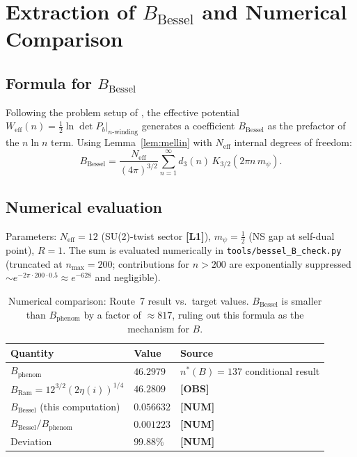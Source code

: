 \documentclass[12pt,a4paper]{article}
\theoremstyle{definition}
\theoremstyle{remark}
\newcommand{\Lone}{\textbf{[L1]}}
\newcommand{\OBS}{\textbf{[OBS]}}
\newcommand{\NUM}{\textbf{[NUM]}}
\begin{document}
\section{Extraction of $B_{\mathrm{Bessel}}$ and Numerical Comparison}
\label{sec:Bbessel}

\subsection{Formula for $B_{\mathrm{Bessel}}$}

Following the problem setup of \cite{mellin_insertion_B}, the effective potential
$W_{\mathrm{eff}}(n) = \tfrac12\ln\det P_b|_{n\text{-winding}}$ generates a
coefficient $B_{\mathrm{Bessel}}$ as the prefactor of the $n\ln n$ term.
Using Lemma~\ref{lem:mellin} with $N_{\mathrm{eff}}$ internal degrees of
freedom:
\begin{equation}
  B_{\mathrm{Bessel}}
  = \frac{N_{\mathrm{eff}}}{(4\pi)^{3/2}}
    \sum_{n=1}^{\infty} d_3(n)\,K_{3/2}(2\pi n\,m_\psi).
  \label{eq:Bbessel}
\end{equation}

\subsection{Numerical evaluation}

Parameters: $N_{\mathrm{eff}} = 12$ (SU(2)-twist sector \Lone{}),
$m_\psi = \tfrac12$ (NS gap at self-dual point), $R = 1$.
The sum is evaluated numerically in \texttt{tools/bessel\_B\_check.py}
(truncated at $n_{\max} = 200$; contributions for $n > 200$ are
exponentially suppressed $\sim e^{-2\pi \cdot 200 \cdot 0.5} \approx e^{-628}$
and negligible).

\begin{table}[ht]
  \centering
  \begin{tabular}{lll}
    \toprule
    Quantity & Value & Source \\
    \midrule
    $B_{\mathrm{phenom}}$ & $46.2979$ & $n^*(B)=137$ conditional result \\
    $B_{\mathrm{Ram}} = 12^{3/2}(2\eta(i))^{1/4}$ & $46.2809$ & \OBS{} \\
    $B_{\mathrm{Bessel}}$ (this computation) & $0.056632$ & \NUM{} \\
    $B_{\mathrm{Bessel}}/B_{\mathrm{phenom}}$ & $0.001223$ & \NUM{} \\
    Deviation & $99.88\%$ & \NUM{} \\
    \bottomrule
  \end{tabular}
  \caption{Numerical comparison: Route~7 result vs.\ target values.
  $B_{\mathrm{Bessel}}$ is smaller than $B_{\mathrm{phenom}}$ by a factor of
  $\approx 817$, ruling out this formula as the mechanism for $B$.}
  \label{tab:comparison}
\end{table}
\end{document}

